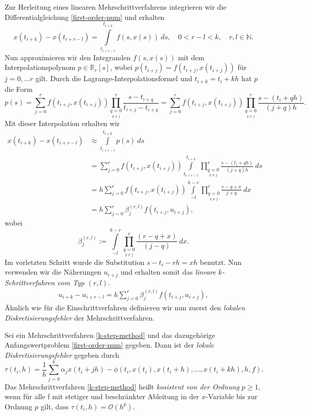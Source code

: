 Zur Herleitung eines linearen Mehrschrittverfahrens integrieren wir die Differentialgleichung \eqref{first-order-num}
und erhalten
\[
    x(t_{i+k}) - x(t_{i+r-l}) = \int\limits_{t_{i+r-l}}^{t_{i+k}} f(s,x(s))\ ds, \quad 0<r-l<k, \quad r,l \in \mathbb{N}.
\]
Nun approximieren wir den Integranden $f(s,x(s))$ mit dem Interpolationspolynom $p \in \mathbb{R}_r[s]$, wobei
$p(t_{i+j})=f(t_{i+j},x(t_{i+j}))$ für $j=0, \dots r$ gilt. Durch die Lagrange-Interpolationsformel
\cite[Kapitel 7]{deuflhardNumerischeMathematik2018} und $t_{i+k}=t_i+kh$ hat $p$ die Form
\[
    p(s)=\sum_{j=0}^{r}f(t_{i+j},x(t_{i+j})) \prod\limits_{\underset{q \neq j}{q=0}}^{r} \frac{s-t_{i+q}}{t_{i+j}-t_{i+q}}
    =\sum_{j=0}^{r}f(t_{i+j},x(t_{i+j})) \prod\limits_{\underset{q \neq j}{q=0}}^{r} \frac{s-(t_i+qh)}{(j+q)h}.
\]
Mit dieser Interpolation erhalten wir
\begin{align*}
    x(t_{i+k}) - x(t_{i+r-l}) &\approx \int\limits_{t_{i+r-l}}^{t_{i+k}} p(s)\ ds \\
    &=\sum_{j=0}^{r}f(t_{i+j},x(t_{i+j})) \int\limits_{t_{i+r-l}}^{t_{i+k}}
    \prod\limits_{\underset{q \neq j}{q=0}}^{r} \frac{s-(t_i+qh)}{(j+q)h}\ ds \\
    &= h \sum_{j=0}^{r}f(t_{i+j},x(t_{i+j})) \int\limits_{-l}^{k-r}
    \prod\limits_{\underset{q \neq j}{q=0}}^{r} \frac{r-q+x}{j+q}\ dx\\
    &=h \sum_{j=0}^{r} \beta_j^{(r,l)} f(t_{i+j},u_{i+j}),
\end{align*}
wobei
\[
    \beta_j^{(r,l)} := \int\limits_{-l}^{k-r} \prod\limits_{\underset{q \neq j}{q=0}}^{r} \frac{(r-q+x)}{(j-q)}\ dx.
\]
Im vorletzten Schritt wurde die Substitution $s-t_i-rh = xh$ benutzt. Nun verwenden wir die Näherungen $u_{i+j}$ und
erhalten somit das \textit{lineare $k$-Schrittverfahren vom Typ $(r,l)$}.
\begin{align}
    \label{k-step-rl}
    u_{i+k}-u_{i+r-l} = h \sum_{j=0}^{r} \beta_j^{(r,l)} f(t_{i+j},u_{i+j}),
\end{align}
Ähnlich wie für die Einschrittverfahren definieren wir nun zuerst den {\em lokalen Diskretisierungsfehler} der
Mehrschrittverfahren.
\begin{definition}
    Sei ein Mehrschrittverfahren \eqref{k-step-method} und das dazugehörige Anfangswertproblem \eqref{first-order-num}
    gegeben. Dann ist der {\em lokale Diskretisierungsfehler} gegeben durch
    \[
        \tau(t_i,h) = \frac{1}{h} \sum_{j=0}^{k} \alpha_j x(t_i + jh) -
        \phi (t_i,x(t_i), x(t_i+h), \dots, x(t_i+kh),h,f).
    \]
    Das Mehrschrittverfahren \eqref{k-step-method} heißt {\em kosistent von der Ordnung} $p\geq 1$, wenn für alle f mit
    stetiger und beschränkter Ableitung in der $x$-Variable bis zur Ordnung $p$ gilt, dass
    $\tau(t_i,h) = \mathcal{O}(h^p)$.
\end{definition}
